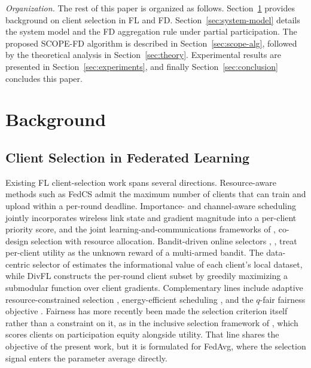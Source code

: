\documentclass[journal]{IEEEtran}
\newcommand{\rev}[1]{#1}
\begin{document}

\textit{Organization.} The rest of this paper is organized as follows. Section~\ref{sec:related-work} provides background on client selection in FL and FD. Section~\ref{sec:system-model} details the system model and the FD aggregation rule under partial participation. The proposed SCOPE-FD algorithm is described in Section~\ref{sec:scope-alg}, followed by the theoretical analysis in Section~\ref{sec:theory}. Experimental results are presented in Section~\ref{sec:experiments}, and finally Section~\ref{sec:conclusion} concludes this paper.

\section{Background}
\label{sec:related-work}

\subsection{Client Selection in Federated Learning}
\label{ssec:rw-fl-selection}

Existing FL client-selection work spans several directions. Resource-aware methods such as FedCS \cite{nishio2019client} admit the maximum number of clients that can train and upload within a per-round deadline. Importance- and channel-aware scheduling \cite{yang2020scheduling, ren2020scheduling, shi2020joint} jointly incorporates wireless link state and gradient magnitude into a per-client priority score, and the joint learning-and-communications frameworks of \cite{chen2021joint}, \cite{chen2021convergence} co-design selection with resource allocation. Bandit-driven online selectors \cite{xia2020mab}, \cite{cho2020bandit}, \cite{xu2021online} treat per-client utility as the unknown reward of a multi-armed bandit. The data-centric selector of \cite{saha2023datacentric} estimates the informational value of each client's local dataset, while DivFL \cite{balakrishnan2022divfl} constructs the per-round client subset by greedily maximizing a submodular function over client gradients. Complementary lines include adaptive resource-constrained selection \cite{wang2019adaptive}, energy-efficient scheduling \cite{yang2021energy}, and the $q$-fair fairness objective \cite{li2020qffl}. \rev{Fairness has more recently been made the selection criterion itself rather than a constraint on it, as in the inclusive selection framework of \cite{arisdakessian2026vox}, which scores clients on participation equity alongside utility. That line shares the objective of the present work, but it is formulated for FedAvg, where the selection signal enters the parameter average directly.}
\end{document}
